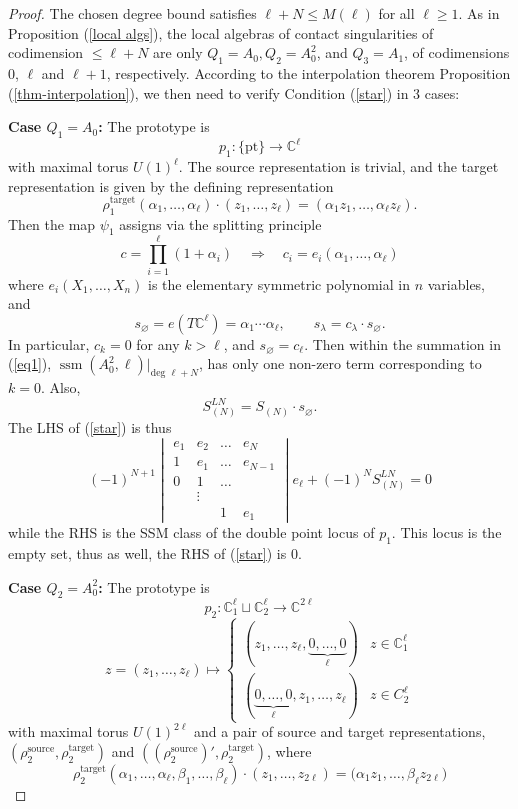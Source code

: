 \documentclass[11pt]{article}
\theoremstyle{plain}
\theoremstyle{definition}
\theoremstyle{definition}
\newcommand{\C}{\mathbb{C}}
\DeclareMathOperator{\ssm}{ssm}
\let\emptyset\varnothing
\begin{document}
\begin{proof}
The chosen degree bound satisfies $\ell+N\leq M(\ell)$ for all $\ell\geq 1$. As in Proposition (\ref{local algs}), the local algebras of contact singularities of codimension $\leq \ell+N$ are only $Q_1=A_0,Q_2=A_0^2$, and $Q_3=A_1$, of codimensions 0, $\ell$ and $\ell+1$, respectively. According to the interpolation theorem Proposition (\ref{thm-interpolation}), we then need to verify Condition (\ref{star}) in 3 cases: 

\textbf{Case $Q_1=A_0$:} The prototype is
\[
p_1: \{\text{pt}\}\to \C^{\ell}
\]
with maximal torus $U(1)^\ell$. The source representation is trivial, and the target representation is given by the defining representation
\[
\rho^{\text{target}}_1(\alpha_1,\dots,\alpha_\ell)\cdot (z_1,\dots,z_\ell)=(\alpha_1z_1,\dots,\alpha_\ell z_\ell).
\]
Then the map $\psi_1$ assigns via the splitting principle
\[
c = \prod_{i=1}^{\ell}(1+\alpha_i)\quad \Rightarrow \quad c_i=e_i(\alpha_1,\dots,\alpha_\ell)
\]
where $e_i(X_1,\dots,X_n)$ is the elementary symmetric polynomial in $n$ variables, and
\[
s_\emptyset = e(T\C^\ell)=\alpha_1\cdots \alpha_\ell,\quad \quad s_\lambda = c_\lambda \cdot s_\emptyset.
\]
In particular, $c_k=0$ for any $k>\ell$, and $s_\emptyset=c_\ell$. Then within the summation in (\ref{eq1}), $\ssm(A_0^2,\ell)|_{\text{deg }\ell+N}$, has only one non-zero term corresponding to $k=0$.
Also, 
\[
S_{(N)}^{LN} = S_{(N)}\cdot s_\emptyset.
\]
The LHS of (\ref{star}) is thus 
\[
(-1)^{N+1}\begin{vmatrix}e_1 & e_2 & \dots&e_{N}\\ 1 & e_1 & \dots&e_{N-1}\\0&1&\dots\\ & \vdots & \\
&&1&e_1\end{vmatrix}e_\ell+(-1)^{N}S_{(N)}^{LN}=0
\]
while the RHS is the SSM class of the double point locus of $p_1$. This locus is the empty set, thus as well, the RHS of (\ref{star}) is 0. 

\textbf{Case $Q_2=A_0^2$:} The prototype is 
\[
p_2: \C_1^\ell\sqcup \C_2^\ell\to\C^{2\ell}
\]
\[
z=(z_1,\dots,z_\ell)\mapsto \begin{cases}
(z_1,\dots,z_\ell,\underbrace{0,\dots,0}_\ell) & z\in \C^\ell_1\\
(\underbrace{0,\dots,0}_\ell,z_1,\dots,z_\ell) & z \in C^\ell_2
\end{cases}
\]
with maximal torus $U(1)^{2\ell}$ and a pair of source and target representations, $(\rho_2^{\text{source}},\rho_2^{\text{target}})$ and $((\rho_2^{\text{source}})',\rho_2^{\text{target}})$, where
\[
\rho_2^{\text{target}}(\alpha_1,\dots,\alpha_\ell,\beta_1,\dots,\beta_\ell)\cdot (z_1,\dots,z_{2\ell}) =\big(\alpha_1 z_1,\dots,\beta_{\ell}z_{2\ell}\big)
\]


\end{proof}
\end{document}
